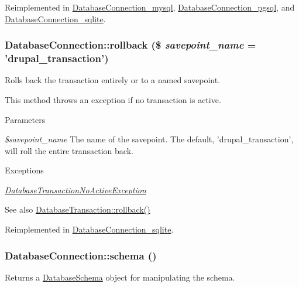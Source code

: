Reimplemented in \hyperlink{classDatabaseConnection__mysql_a928309f48ddbeeca25328fec33c4ab9e}{DatabaseConnection\_\-mysql}, \hyperlink{classDatabaseConnection__pgsql_a4256f910e0d93f1fc28ea65aa1f1f145}{DatabaseConnection\_\-pgsql}, and \hyperlink{classDatabaseConnection__sqlite_a547c5fcee9fa8ef98e15f61ab83be6be}{DatabaseConnection\_\-sqlite}.\hypertarget{classDatabaseConnection_aef0f8cd6cbfbc304e721baaa14be14cf}{
\subsubsection[{rollback}]{\setlength{\rightskip}{0pt plus 5cm}DatabaseConnection::rollback (\$ {\em savepoint\_\-name} = {\ttfamily 'drupal\_\-transaction'})}}
\label{classDatabaseConnection_aef0f8cd6cbfbc304e721baaa14be14cf}
Rolls back the transaction entirely or to a named savepoint.

This method throws an exception if no transaction is active.


\begin{DoxyParams}{Parameters}
\item[{\em \$savepoint\_\-name}]The name of the savepoint. The default, 'drupal\_\-transaction', will roll the entire transaction back.\end{DoxyParams}

\begin{DoxyExceptions}{Exceptions}
\item[{\em \hyperlink{classDatabaseTransactionNoActiveException}{DatabaseTransactionNoActiveException}}]\end{DoxyExceptions}
\begin{DoxySeeAlso}{See also}
\hyperlink{classDatabaseTransaction_a51bdf8ca9423cc331e877dbf43cd6981}{DatabaseTransaction::rollback()} 
\end{DoxySeeAlso}


Reimplemented in \hyperlink{classDatabaseConnection__sqlite_aa0c95a9076d4aa2d08569d344eeb81de}{DatabaseConnection\_\-sqlite}.\hypertarget{classDatabaseConnection_a809aee6bbab9d383927be8f307b7ef7b}{
\subsubsection[{schema}]{\setlength{\rightskip}{0pt plus 5cm}DatabaseConnection::schema ()}}
\label{classDatabaseConnection_a809aee6bbab9d383927be8f307b7ef7b}
Returns a \hyperlink{classDatabaseSchema}{DatabaseSchema} object for manipulating the schema.

